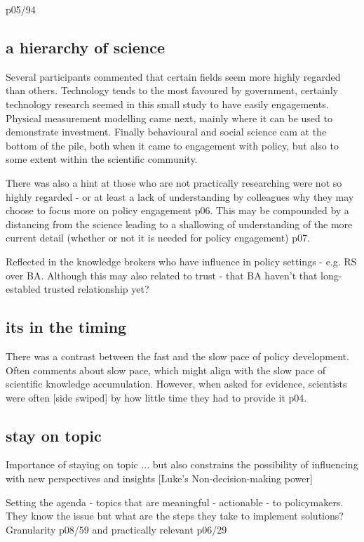 p05/94

\subsection{a hierarchy of science}
Several participants commented that certain fields seem more highly regarded than others. Technology tends to the most favoured by government, certainly technology research seemed in this small study to have easily engagements. Physical measurement modelling came next, mainly where it can be used to demonstrate investment. Finally behavioural and social science cam at the bottom of the pile, both when it came to engagement with policy, but also to some extent within the scientific community.

There was also a hint at those who are not practically researching were not so highly regarded - or at least a lack of understanding by colleagues why they may choose to focus more on policy engagement p06. This may be compounded by a distancing from the science leading to a shallowing of understanding of the more current detail (whether or not it is needed for policy engagement) p07. 

Reflected in the knowledge brokers who have influence in policy settings - e.g. RS over BA. Although this may also related to trust - that BA haven't that long-establed trusted relationship yet?

\subsection{its in the timing}
There was a contrast between the fast and the slow pace of policy development. Often comments about slow pace, which might align with the slow pace of scientific knowledge accumulation. However, when asked for evidence, scientists were often [side swiped] by how little time they had to provide it p04.  

\subsection{stay on topic}
Importance of staying on topic ... but also constrains the possibility of influencing with new perspectives and insights [Luke's Non-decision-making power]

Setting the agenda - topics that are meaningful - actionable - to policymakers. They know the issue but what are the steps they take to implement solutions? Granularity p08/59 and practically relevant p06/29


